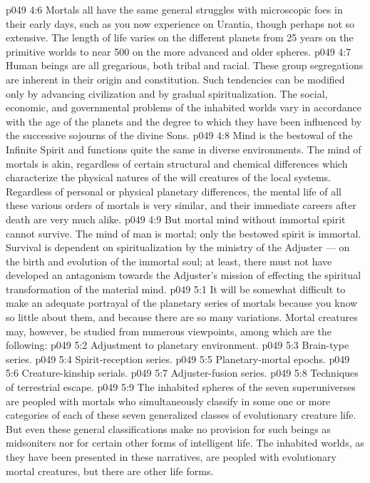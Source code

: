 \vs p049 4:6 Mortals all have the same general struggles with microscopic foes in their early days, such as you now experience on Urantia, though perhaps not so extensive. The length of life varies on the different planets from 25 years on the primitive worlds to near 500 on the more advanced and older spheres.
\vs p049 4:7 Human beings are all gregarious, both tribal and racial. These group segregations are inherent in their origin and constitution. Such tendencies can be modified only by advancing civilization and by gradual spiritualization. The social, economic, and governmental problems of the inhabited worlds vary in accordance with the age of the planets and the degree to which they have been influenced by the successive sojourns of the divine Sons.
\vs p049 4:8 \pc Mind is the bestowal of the Infinite Spirit and functions quite the same in diverse environments. The mind of mortals is akin, regardless of certain structural and chemical differences which characterize the physical natures of the will creatures of the local systems. Regardless of personal or physical planetary differences, the mental life of all these various orders of mortals is very similar, and their immediate careers after death are very much alike.
\vs p049 4:9 But mortal mind without immortal spirit cannot survive. The mind of man is mortal; only the bestowed spirit is immortal. Survival is dependent on spiritualization by the ministry of the Adjuster --- on the birth and evolution of the immortal soul; at least, there must not have developed an antagonism towards the Adjuster’s mission of effecting the spiritual transformation of the material mind.
\vs p049 5:1 It will be somewhat difficult to make an adequate portrayal of the planetary series of mortals because you know so little about them, and because there are so many variations. Mortal creatures may, however, be studied from numerous viewpoints, among which are the following:
\vs p049 5:2 \bibnobreakspace Adjustment to planetary environment.
\vs p049 5:3 \bibnobreakspace Brain\hyp{}type series.
\vs p049 5:4 \bibnobreakspace Spirit\hyp{}reception series.
\vs p049 5:5 \bibnobreakspace Planetary\hyp{}mortal epochs.
\vs p049 5:6 \bibnobreakspace Creature\hyp{}kinship serials.
\vs p049 5:7 \bibnobreakspace Adjuster\hyp{}fusion series.
\vs p049 5:8 \bibnobreakspace Techniques of terrestrial escape.
\vs p049 5:9 \pc The inhabited spheres of the seven superuniverses are peopled with mortals who simultaneously classify in some one or more categories of each of these seven generalized classes of evolutionary creature life. But even these general classifications make no provision for such beings as midsoniters nor for certain other forms of intelligent life. The inhabited worlds, as they have been presented in these narratives, are peopled with evolutionary mortal creatures, but there are other life forms.
